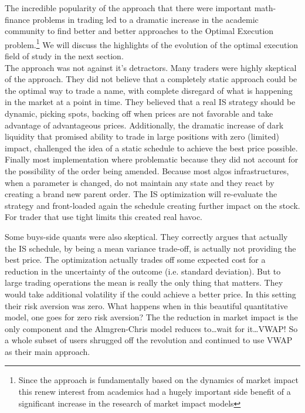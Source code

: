 The incredible popularity of the approach that there were important math-finance problems in trading led to a dramatic increase in the academic community to find better and better approaches to the Optimal Execution problem.\footnote{Since the approach is fundamentally based on the dynamics of market impact this renew interest from academics had  a hugely important side benefit of a significant increase in the research of market impact models} We will discuss the highlights of the evolution of the optimal execution field of study in the next section.\\

The approach was not against it's detractors. Many traders were highly skeptical of the approach. They did not believe that a completely static approach could be the optimal way to trade a name, with complete disregard of what is happening in the market at a point in time. They believed that a real IS strategy should be dynamic, picking spots,  backing off when prices are not favorable and take advantage of advantageous prices.  Additionally, the dramatic increase of dark liquidity that promised ability to trade in large positions with zero (limited) impact, challenged the idea of a static schedule to achieve the best price possible. Finally most implementation where problematic because they did not account for the possibility of the order being amended. Because most algos infrastructures, when a parameter is changed, do not maintain any state and they react by creating a brand new parent order. The IS optimization will re-evaluate the strategy and front-loaded again the schedule creating further impact on the stock. For trader that use tight limits this created real havoc.

Some buys-side quants were also skeptical. They correctly argues that actually the IS schedule, by being a mean variance trade-off, is actually not providing the best price. The optimization actually trades off some expected cost for a reduction in the uncertainty of the outcome (i.e. standard deviation).  But to large trading operations the mean is really the only thing that matters. They would take additional volatility if the could achieve a better price. In this setting their risk aversion was zero. What happens when in this beautiful quantitative model, one goes for zero risk aversion? The the reduction in market impact is the only component and the Almgren-Chris model reduces to\dots  wait for it\dots VWAP! So a whole subset of users shrugged off the revolution and continued to use VWAP as their main approach.\\

